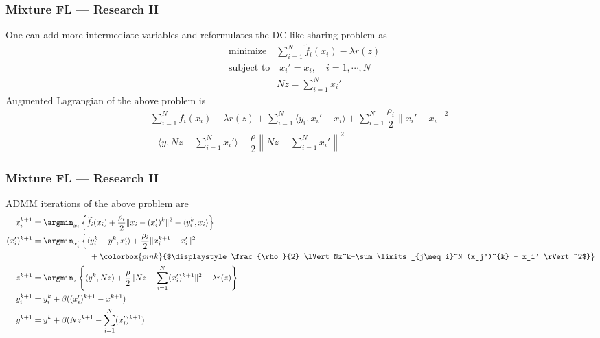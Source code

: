 \begin{frame}
\frametitle{Mixture FL --- Research II}

One can add more intermediate variables and reformulates the DC-like sharing problem as
\begin{align*}
    & \text{minimize} \quad \sum\limits_{i=1}^N \widetilde{f}_i(x_i) - \lambda r(z) \\
    & \text{subject to} \quad x_i' = x_i, \quad i=1,\cdots,N \\
    & \phantom{subject to} \quad Nz = \sum\limits_{i=1}^N x_i'
\end{align*}
Augmented Lagrangian of the above problem is
{\footnotesize
\begin{multline*}
    \sum\limits_{i=1}^N \widetilde{f}_i(x_i) - \lambda r(z) + \sum\limits_{i=1}^N \langle y_i, x_i'-x_i\rangle + \sum\limits_{i=1}^N \dfrac{\rho_i}{2} \lVert x_i'-x_i \rVert^2 \\
    + \langle y, Nz-\sum\limits_{i=1}^N x_i'\rangle + \dfrac{\rho}{2} \left\lVert Nz-\sum\limits_{i=1}^N x_i' \right\rVert^2
\end{multline*}
}

\end{frame}


\begin{frame}
\frametitle{Mixture FL --- Research II}

ADMM iterations of the above problem are
{\footnotesize
\begin{align*}
    x_i^{k+1} & = \argmin_{x_i} \left\{ \widetilde{f}_i(x_i) + \frac{\rho_i}{2} \lVert x_i-(x_i')^k \rVert^2 - \langle y_i^k, x_i \rangle \right\} \\
    (x_i')^{k+1} & = \argmin_{x_i'} \left\{ \langle y_i^k-y^k, x_i' \rangle + \frac{\rho_i}{2} \lVert x_i^{k+1}-x_i' \rVert^2 \right. \\
    & \hspace{7em} + \colorbox{pink}{$\displaystyle \frac{\rho}{2} \lVert Nz^k-\sum\limits_{j\neq i}^N (x_j')^{k} - x_i' \rVert^2$} \} \\
    z^{k+1} & = \argmin_{z} \left\{ \langle y^k, Nz \rangle + \frac{\rho}{2} \lVert Nz - \sum\limits_{i=1}^N (x_i')^{k+1} \rVert^2 - \lambda r(z) \right\} \\
    y_i^{k+1} & = y_i^k + \beta ((x_i')^{k+1} - x^{k+1}) \\
    y^{k+1} & = y^k + \beta (Nz^{k+1} - \sum\limits_{i=1}^N (x_i')^{k+1})
\end{align*}
}

\end{frame}


